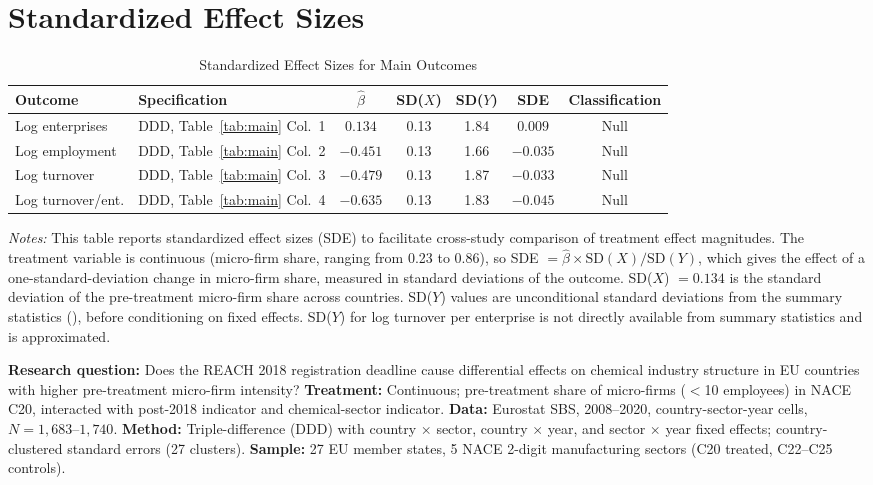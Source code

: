 \documentclass[12pt]{article}
\begin{document}
\section{Standardized Effect Sizes}
\label{sec:sde}

\begin{table}[H]
\centering
\caption{Standardized Effect Sizes for Main Outcomes}
\label{tab:sde}
\begin{adjustbox}{max width=\textwidth}
\begin{tabular}{llccccc}
\toprule
Outcome & Specification & $\hat{\beta}$ & SD($X$) & SD($Y$) & SDE & Classification \\
\midrule
Log enterprises      & DDD, Table~\ref{tab:main} Col.~1   & $0.134$  & 0.13 & 1.84 & $0.009$ & Null \\
Log employment       & DDD, Table~\ref{tab:main} Col.~2   & $-0.451$ & 0.13 & 1.66 & $-0.035$ & Null \\
Log turnover         & DDD, Table~\ref{tab:main} Col.~3   & $-0.479$ & 0.13 & 1.87 & $-0.033$ & Null \\
Log turnover/ent.    & DDD, Table~\ref{tab:main} Col.~4   & $-0.635$ & 0.13 & 1.83 & $-0.045$ & Null \\
\bottomrule
\end{tabular}
\end{adjustbox}
\par\vspace{0.3em}
{\footnotesize \emph{Notes:} This table reports standardized effect sizes (SDE)
to facilitate cross-study comparison of treatment effect magnitudes.
The treatment variable is continuous (micro-firm share, ranging from 0.23 to 0.86), so
SDE $= \hat{\beta} \times \text{SD}(X) / \text{SD}(Y)$,
which gives the effect of a one-standard-deviation change in micro-firm share,
measured in standard deviations of the outcome.
SD($X$) $= 0.134$ is the standard deviation of the pre-treatment micro-firm share across countries.
SD($Y$) values are unconditional standard deviations from the summary
statistics (), before conditioning on fixed effects.
SD($Y$) for log turnover per enterprise is not directly available from summary statistics and is approximated.

\textbf{Research question:} Does the REACH 2018 registration deadline cause differential effects on chemical industry structure in EU countries with higher pre-treatment micro-firm intensity?
\textbf{Treatment:} Continuous; pre-treatment share of micro-firms ($<$10 employees) in NACE C20, interacted with post-2018 indicator and chemical-sector indicator.
\textbf{Data:} Eurostat SBS, 2008--2020, country-sector-year cells, $N = 1{,}683$--$1{,}740$.
\textbf{Method:} Triple-difference (DDD) with country $\times$ sector, country $\times$ year, and sector $\times$ year fixed effects; country-clustered standard errors (27 clusters).
\textbf{Sample:} 27 EU member states, 5 NACE 2-digit manufacturing sectors (C20 treated, C22--C25 controls).

}
\end{table}
\end{document}
